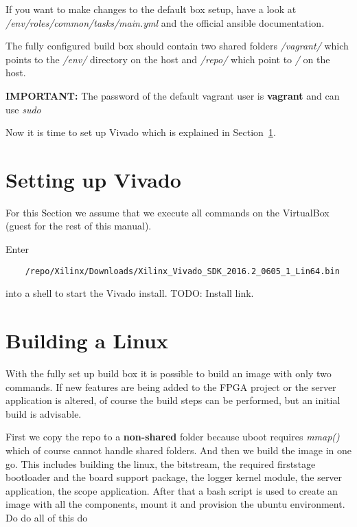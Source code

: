 If  you want  to  make  changes to  the  default box  setup,  have  a look  at
\textit{/env/roles/common/tasks/main.yml} and the official ansible\cite{TODO:}
documentation.

The   fully  configured   build  box   should  contain   two  shared   folders
\textit{/vagrant/} which  points to the  \textit{/env/} directory on  the host
and \textit{/repo/} which point to \textit{/} on the host.

\textbf{IMPORTANT:} The   password   of   the    default   vagrant   user   is
\textbf{vagrant} and can use \textit{sudo}

Now   it    is   time   to   set    up   Vivado   which   is    explained   in
Section~\ref{sec:devguide:fpga_toolchain:vivado}.

\section{Setting up Vivado}
\label{sec:devguide:fpga_toolchain:vivado}

For this  Section we  assume that  we execute all  commands on  the VirtualBox
(guest for the rest of this manual).

Enter

\begin{listing}
    \begin{verbatim}
    /repo/Xilinx/Downloads/Xilinx_Vivado_SDK_2016.2_0605_1_Lin64.bin
    \end{verbatim}
\end{listing}

into a shell to start the Vivado install.
TODO: Install link.

\section{Building a Linux}
\label{sec:devguide:fpga_toolchain:linux}

With the fully set up build box it is possible to build an image with only two
commands.
If new features are being added to  the FPGA project or the server application
is altered, of course  the build steps can be performed,  but an initial build
is advisable.

First we copy the repo to  a \textbf{non-shared} folder because uboot requires
\textit{mmap()} which of course cannot handle shared folders.
And then we build  the image in one go. This includes  building the linux, the
bitstream, the required  firststage bootloader and the  board support package,
the logger kernel module, the server application, the scope application.
After that a bash  script is used to create an image  with all the components,
mount it and provision the ubuntu environment.
Do do all of this do


